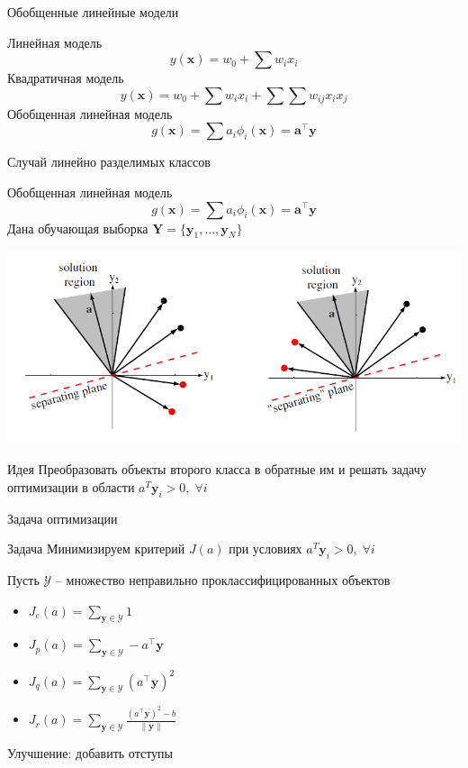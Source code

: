 \documentclass[10pt]{beamer}
\begin{document}
\begin{frame}{Обобщенные линейные модели}

Линейная модель
\[
y(\mathbf{x}) = w_0 + \sum w_i x_i
\]
Квадратичная модель
\[
y(\mathbf{x}) = w_0 + \sum w_i x_i + \sum \sum w_{ij} x_i x_j
\]
Обобщенная линейная модель
\[
g(\mathbf{x}) = \sum a_i \phi_i(\mathbf{x}) = \mathbf{a}^\top \mathbf{y}
\]

\end{frame}

\begin{frame}{Случай линейно разделимых классов}

Обобщенная линейная модель
\[
g(\mathbf{x}) = \sum a_i \phi_i(\mathbf{x}) = \mathbf{a}^\top \mathbf{y}
\]
Дана обучающая выборка $\mathbf{Y} = \{\mathbf{y}_1, \ldots, \mathbf{y}_N\}$

\begin{center}
\includegraphics[scale=0.35]{images/optimzation.png}
\end{center}

\begin{exampleblock}{Идея}
Преобразовать объекты второго класса в обратные им и решать задачу оптимизации в области $a^T \mathbf{y}_i > 0, \; \forall i$
\end{exampleblock}

\end{frame}

\begin{frame}{Задача оптимизации}

\begin{block}{Задача}
Минимизируем критерий $J(a)$ при условиях $a^T \mathbf{y}_i > 0, \; \forall i$
\end{block}

Пусть $\mathcal{Y}$ -- множество неправильно проклассифицированных объектов
\begin{itemize}
\item $J_e(a) = \sum_{\mathbf{y} \in \mathcal{Y}} 1$ 
\item $J_p(a) = \sum_{\mathbf{y} \in \mathcal{Y}} - a^\top \mathbf{y}$ 
\item $J_q(a) = \sum_{\mathbf{y} \in \mathcal{Y}} (a^\top \mathbf{y})^2$
\item $J_r(a) = \sum_{\mathbf{y} \in \mathcal{Y}} \frac{(a^\top \mathbf{y})^2 - b}{\|\mathbf{y}\|}$
\end{itemize}
Улучшение: добавить отступы

\end{frame}
\end{document}
